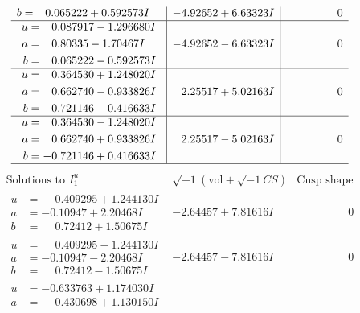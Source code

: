 \documentclass[1p]{elsarticle_modified}
\theoremstyle{definition}
\newcommand{\I}{\sqrt{-1}}
\begin{document}
$$\begin{array}{c|c|c}
\begin{aligned}
b &= \phantom{-}0.065222 + 0.592573 I\end{aligned}
 & -4.92652 + 6.63323 I & \phantom{-0.000000 } 0 \\ \hline\begin{aligned}
u &= \phantom{-}0.087917 - 1.296680 I \\
a &= \phantom{-}0.80335 - 1.70467 I \\
b &= \phantom{-}0.065222 - 0.592573 I\end{aligned}
 & -4.92652 - 6.63323 I & \phantom{-0.000000 } 0 \\ \hline\begin{aligned}
u &= \phantom{-}0.364530 + 1.248020 I \\
a &= \phantom{-}0.662740 - 0.933826 I \\
b &= -0.721146 - 0.416633 I\end{aligned}
 & \phantom{-}2.25517 + 5.02163 I & \phantom{-0.000000 } 0 \\ \hline\begin{aligned}
u &= \phantom{-}0.364530 - 1.248020 I \\
a &= \phantom{-}0.662740 + 0.933826 I \\
b &= -0.721146 + 0.416633 I\end{aligned}
 & \phantom{-}2.25517 - 5.02163 I & \phantom{-0.000000 } 0\\
 \hline 
 \end{array}$$\newpage$$\begin{array}{c|c|c}  
\text{Solutions to }I^u_{1}& \I (\text{vol} + \sqrt{-1}CS) & \text{Cusp shape}\\
 \hline 
\begin{aligned}
u &= \phantom{-}0.409295 + 1.244130 I \\
a &= -0.10947 + 2.20468 I \\
b &= \phantom{-}0.72412 + 1.50675 I\end{aligned}
 & -2.64457 + 7.81616 I & \phantom{-0.000000 } 0 \\ \hline\begin{aligned}
u &= \phantom{-}0.409295 - 1.244130 I \\
a &= -0.10947 - 2.20468 I \\
b &= \phantom{-}0.72412 - 1.50675 I\end{aligned}
 & -2.64457 - 7.81616 I & \phantom{-0.000000 } 0 \\ \hline\begin{aligned}
u &= -0.633763 + 1.174030 I \\
a &= \phantom{-}0.430698 + 1.130150 I \\

\end{aligned}
\end{array}$$
\end{document}
